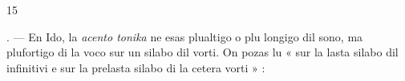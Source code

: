 \begin{VUpage}[19]{15}
\VUsaut{6.98mm}
\VUsaut{4.56mm}

. --- En Ido, la \textit{acento tonika} ne esas plualtigo o plu\cc
longigo dil sono, ma plufortigo di la voco sur un silabo dil\nl
vorti. On pozas lu « sur la lasta silabo dil infinitivi\nl
e sur la prelasta silabo di la cetera vorti » : 
\parplein
\end{VUpage}

